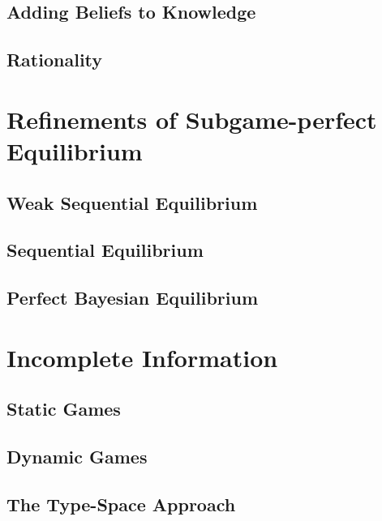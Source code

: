 		\section{Adding Beliefs to Knowledge}

		\section{Rationality}

	\chapter{Refinements of Subgame-perfect Equilibrium}
		\section{Weak Sequential Equilibrium}

		\section{Sequential Equilibrium}

		\section{Perfect Bayesian Equilibrium}

	\chapter{Incomplete Information}
		\section{Static Games}

		\section{Dynamic Games}

		\section{The Type-Space Approach}